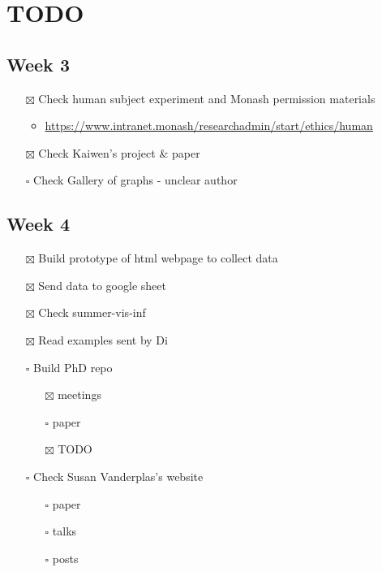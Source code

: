 \documentclass[
]{book}
\providecommand{\tightlist}{%
  \setlength{\itemsep}{0pt}\setlength{\parskip}{0pt}}
\begin{document}
\hypertarget{todo}{%
\chapter{TODO}\label{todo}}

\hypertarget{week-3}{%
\section{Week 3}\label{week-3}}

\begin{itemize}
\tightlist
\item[$\boxtimes$]
  Check human subject experiment and Monash permission materials

  \begin{itemize}
  \tightlist
  \item
    \url{https://www.intranet.monash/researchadmin/start/ethics/human}
  \end{itemize}
\item[$\boxtimes$]
  Check Kaiwen's project \& paper
\item[$\square$]
  Check Gallery of graphs - unclear author
\end{itemize}

\hypertarget{week-4}{%
\section{Week 4}\label{week-4}}

\begin{itemize}
\tightlist
\item[$\boxtimes$]
  Build prototype of html webpage to collect data
\item[$\boxtimes$]
  Send data to google sheet
\item[$\boxtimes$]
  Check summer-vis-inf
\item[$\boxtimes$]
  Read examples sent by Di
\item[$\square$]
  Build PhD repo

  \begin{itemize}
  \tightlist
  \item[$\boxtimes$]
    meetings
  \item[$\square$]
    paper
  \item[$\boxtimes$]
    TODO
  \end{itemize}
\item[$\square$]
  Check Susan Vanderplas's website

  \begin{itemize}
  \tightlist
  \item[$\square$]
    paper
  \item[$\square$]
    talks
  \item[$\square$]
    posts
  \end{itemize}
\end{itemize}
\end{document}
